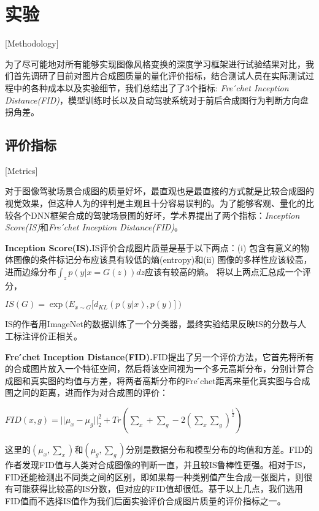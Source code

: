

\chapter{实验}[Methodology]


为了尽可能地对所有能够实现图像风格变换的深度学习框架进行试验结果对比，我们首先调研了目前对图片合成图质量的量化评价指标，结合测试人员在实际测试过程中的各种成本以及实验细节，我们总结出了了3个指标: \textit{Fre ́chet Inception Distance(FID)}\cite{FID}，模型训练时长以及自动驾驶系统对于前后合成图行为判断方向盘拐角差。

\section{评价指标}[Metrics]

对于图像驾驶场景合成图的质量好坏，最直观也是最直接的方式就是比较合成图的视觉效果，但这种人为的评判是主观且十分容易误判的。为了能够客观、量化的比较各个DNN框架合成的驾驶场景图的好坏，学术界提出了两个指标：\textit{Inception Score(IS)}\cite{IS}和\textit{Fre ́chet Inception Distance(FID)}\cite{FID}。

\textbf{Inception Score(IS).\cite{IS}}\quad IS评价合成图片质量是基于以下两点：(i) 包含有意义的物体图像的条件标记分布应该具有较低的熵(entropy)和(ii) 图像的多样性应该较高，进而边缘分布$\int_z p(y|x=G(z))dz$应该有较高的熵。
将以上两点汇总成一个评分，
\begin{center}
    $IS(G)=\exp{(E_{x\sim G}[d_{KL}(p(y|x), p(y)])}$
\end{center}
IS的作者用ImageNet\cite{ImageNet}的数据训练了一个分类器，最终实验结果反映IS的分数与人工标注评价正相关。

\textbf{Fre ́chet Inception Distance(FID).\cite{FID}}\quad FID提出了另一个评价方法，它首先将所有的合成图片放入一个特征空间，然后将该空间视为一个多元高斯分布，分别计算合成图和真实图的均值与方差，将两者高斯分布的Fre ́chet距离来量化真实图与合成图之间的距离，进而作为对合成图的评价：
\begin{center}
    $FID(x,g)=||\mu_x-\mu_g||_2^2+Tr(\sum_x + \sum_g - 2(\sum_x\sum_g)^{\frac{1}{2}})$
\end{center}
这里的$(\mu_x,\sum_x)$和$(\mu_g,\sum_g)$分别是数据分布和模型分布的均值和方差。FID的作者发现FID值与人类对合成图像的判断一直，并且较IS\cite{IS}鲁棒性更强。相对于IS，FID还能检测出不同类之间的区别，即如果每一种类别值产生合成一张图片，则很有可能获得比较高的IS分数，但对应的FID值却很低。基于以上几点，我们选用FID值而不选择IS值作为我们后面实验评价合成图片质量的评价指标之一。


